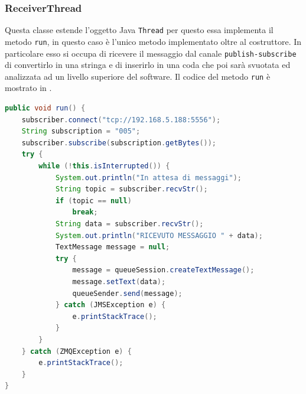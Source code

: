\subsubsection{ReceiverThread}
Questa classe estende l'oggetto Java \texttt{Thread} per questo essa implementa il metodo \texttt{run}, in questo caso è l'unico metodo implementato oltre al costruttore. In particolare esso si occupa di ricevere il messaggio dal canale \texttt{publish-subscribe} di convertirlo in una stringa e di inserirlo in una coda che poi sarà svuotata ed analizzata ad un livello superiore del software. Il codice del metodo \texttt{run} è mostrato in .
\begin{lstlisting}[language=JAVA,caption=Metodo run,label=lst:runpublish]
public void run() {
    subscriber.connect("tcp://192.168.5.188:5556");
    String subscription = "005";
    subscriber.subscribe(subscription.getBytes());
    try {
        while (!this.isInterrupted()) {
            System.out.println("In attesa di messaggi");
            String topic = subscriber.recvStr();
            if (topic == null)
                break;
            String data = subscriber.recvStr();
            System.out.println("RICEVUTO MESSAGGIO " + data);
            TextMessage message = null;
            try {
                message = queueSession.createTextMessage();
                message.setText(data);
                queueSender.send(message);
            } catch (JMSException e) {
                e.printStackTrace();
            }
        }
    } catch (ZMQException e) {
        e.printStackTrace();
    }
}
\end{lstlisting}